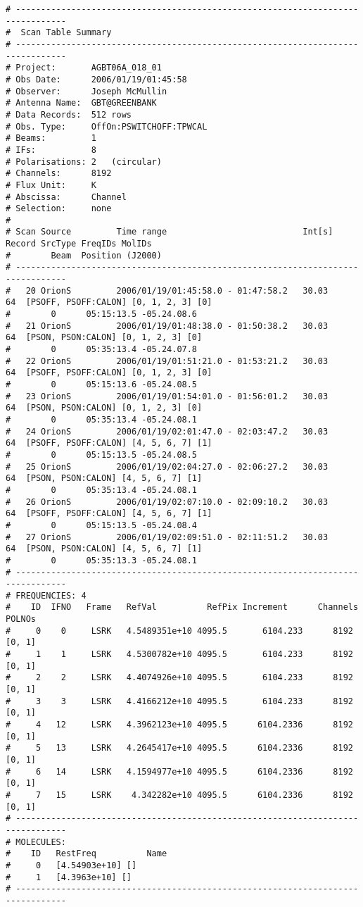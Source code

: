 \begin{verbatim}
# --------------------------------------------------------------------------------
#  Scan Table Summary
# --------------------------------------------------------------------------------
# Project:       AGBT06A_018_01
# Obs Date:      2006/01/19/01:45:58
# Observer:      Joseph McMullin
# Antenna Name:  GBT@GREENBANK
# Data Records:  512 rows
# Obs. Type:     OffOn:PSWITCHOFF:TPWCAL
# Beams:         1   
# IFs:           8   
# Polarisations: 2   (circular)
# Channels:      8192
# Flux Unit:     K
# Abscissa:      Channel
# Selection:     none
#
# Scan Source         Time range                           Int[s] Record SrcType FreqIDs MolIDs 
#        Beam  Position (J2000)       
# --------------------------------------------------------------------------------
#   20 OrionS         2006/01/19/01:45:58.0 - 01:47:58.2   30.03     64  [PSOFF, PSOFF:CALON] [0, 1, 2, 3] [0]
#        0      05:15:13.5 -05.24.08.6
#   21 OrionS         2006/01/19/01:48:38.0 - 01:50:38.2   30.03     64  [PSON, PSON:CALON] [0, 1, 2, 3] [0]
#        0      05:35:13.4 -05.24.07.8
#   22 OrionS         2006/01/19/01:51:21.0 - 01:53:21.2   30.03     64  [PSOFF, PSOFF:CALON] [0, 1, 2, 3] [0]
#        0      05:15:13.6 -05.24.08.5
#   23 OrionS         2006/01/19/01:54:01.0 - 01:56:01.2   30.03     64  [PSON, PSON:CALON] [0, 1, 2, 3] [0]
#        0      05:35:13.4 -05.24.08.1
#   24 OrionS         2006/01/19/02:01:47.0 - 02:03:47.2   30.03     64  [PSOFF, PSOFF:CALON] [4, 5, 6, 7] [1]
#        0      05:15:13.5 -05.24.08.5
#   25 OrionS         2006/01/19/02:04:27.0 - 02:06:27.2   30.03     64  [PSON, PSON:CALON] [4, 5, 6, 7] [1]
#        0      05:35:13.4 -05.24.08.1
#   26 OrionS         2006/01/19/02:07:10.0 - 02:09:10.2   30.03     64  [PSOFF, PSOFF:CALON] [4, 5, 6, 7] [1]
#        0      05:15:13.5 -05.24.08.4
#   27 OrionS         2006/01/19/02:09:51.0 - 02:11:51.2   30.03     64  [PSON, PSON:CALON] [4, 5, 6, 7] [1]
#        0      05:35:13.3 -05.24.08.1
# --------------------------------------------------------------------------------
# FREQUENCIES: 4
#    ID  IFNO   Frame   RefVal          RefPix Increment      Channels POLNOs
#     0    0     LSRK   4.5489351e+10 4095.5       6104.233      8192  [0, 1]
#     1    1     LSRK   4.5300782e+10 4095.5       6104.233      8192  [0, 1]
#     2    2     LSRK   4.4074926e+10 4095.5       6104.233      8192  [0, 1]
#     3    3     LSRK   4.4166212e+10 4095.5       6104.233      8192  [0, 1]
#     4   12     LSRK   4.3962123e+10 4095.5      6104.2336      8192  [0, 1]
#     5   13     LSRK   4.2645417e+10 4095.5      6104.2336      8192  [0, 1]
#     6   14     LSRK   4.1594977e+10 4095.5      6104.2336      8192  [0, 1]
#     7   15     LSRK    4.342282e+10 4095.5      6104.2336      8192  [0, 1]
# --------------------------------------------------------------------------------
# MOLECULES: 
#    ID   RestFreq          Name           
#     0   [4.54903e+10] []
#     1   [4.3963e+10] []
# --------------------------------------------------------------------------------
\end{verbatim}

